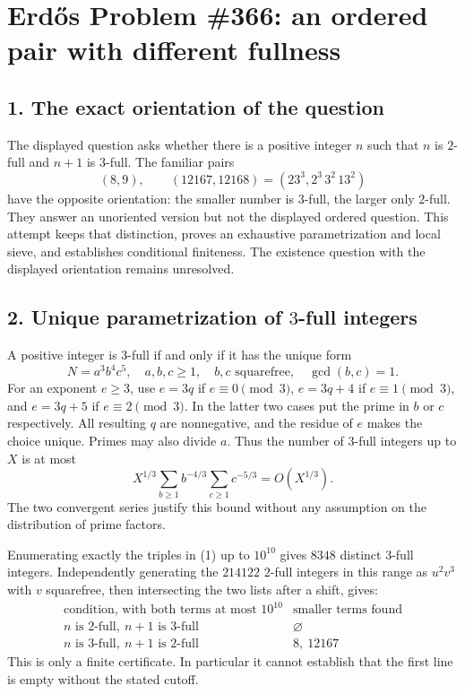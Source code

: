 \section*{Erd\H{o}s Problem \#366: an ordered pair with different fullness}
\subsection*{1. The exact orientation of the question}
The displayed question asks whether there is a positive integer $n$
such that $n$ is $2$-full and $n+1$ is $3$-full.
The familiar pairs
\[
 (8,9),\qquad(12167,12168)=(23^3,2^3\,3^2\,13^2)
\]
have the opposite orientation: the smaller number is $3$-full,
the larger only $2$-full. They answer an unoriented version but
not the displayed ordered question. This attempt keeps that
distinction, proves an exhaustive parametrization and local sieve,
and establishes conditional finiteness. The existence question
with the displayed orientation remains unresolved.

\subsection*{2. Unique parametrization of $3$-full integers}
A positive integer is $3$-full if and only if it has the unique form
\[
 N=a^3b^4c^5,\quad a,b,c\ge1,\quad
 b,c\text{ squarefree},\quad\gcd(b,c)=1.            \tag{1}
\]
For an exponent $e\ge3$, use $e=3q$ if $e\equiv0\pmod3$,
$e=3q+4$ if $e\equiv1\pmod3$, and $e=3q+5$ if
$e\equiv2\pmod3$. In the latter two cases put the prime in $b$
or $c$ respectively. All resulting $q$ are nonnegative, and
the residue of $e$ makes the choice unique. Primes may also divide $a$.
Thus the number of $3$-full integers up to $X$ is at most
\[
 X^{1/3}\sum_{b\ge1}b^{-4/3}\sum_{c\ge1}c^{-5/3}
 =O(X^{1/3}).                                    \tag{2}
\]
The two convergent series justify this bound without any assumption
on the distribution of prime factors.

Enumerating exactly the triples in (1) up to $10^{10}$ gives $8348$
distinct $3$-full integers. Independently generating the $214122$
$2$-full integers in this range as $u^2v^3$ with $v$ squarefree,
then intersecting the two lists after a shift, gives:
\[
 \begin{array}{c|l}
 \text{condition, with both terms at most }10^{10}
      &\text{smaller terms found}\\ \hline
 n\text{ is }2\text{-full},\ n+1\text{ is }3\text{-full}&\varnothing\\
 n\text{ is }3\text{-full},\ n+1\text{ is }2\text{-full}&8,\ 12167
 \end{array}
\]
This is only a finite certificate. In particular it cannot establish
that the first line is empty without the stated cutoff.

